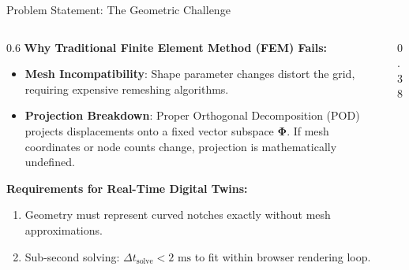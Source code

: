 \documentclass[aspectratio=169, 10pt]{beamer}
\begin{document}
\begin{frame}{Problem Statement: The Geometric Challenge}
    \begin{columns}
        \begin{column}{0.6\textwidth}
            \textbf{Why Traditional Finite Element Method (FEM) Fails:}
            \begin{itemize}
                \item \textbf{Mesh Incompatibility}: Shape parameter changes distort the grid, requiring expensive remeshing algorithms.
                \item \textbf{Projection Breakdown}: Proper Orthogonal Decomposition (POD) projects displacements onto a fixed vector subspace $\boldsymbol{\Phi}$. If mesh coordinates or node counts change, projection is mathematically undefined.
            \end{itemize}
            \vspace{0.3cm}
            \textbf{Requirements for Real-Time Digital Twins:}
            \begin{enumerate}
                \item Geometry must represent curved notches exactly without mesh approximations.
                \item Sub-second solving: $\Delta t_{\text{solve}} < 2\text{ ms}$ to fit within browser rendering loop.
            \end{enumerate}
        \end{column}
        \begin{column}{0.38\textwidth}
            \centering
        \end{column}
    \end{columns}
\end{frame}
\end{document}
